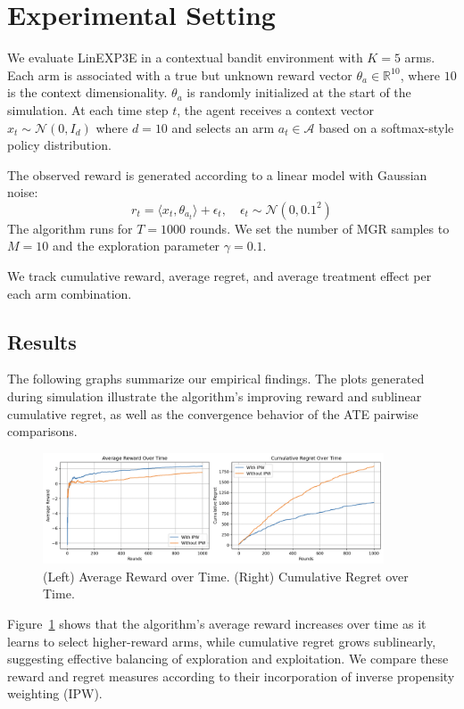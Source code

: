
\section{Experimental Setting}\label{sec:experiments}

We evaluate LinEXP3E in a contextual bandit environment with $K = 5$ arms. Each arm is associated with a true but unknown reward vector $\theta_a \in \mathbb{R}^{10}$, where $10$ is the context dimensionality. $\theta_a$ is randomly initialized at the start of the simulation. At each time step $t$, the agent receives a context vector $x_t \sim \mathcal{N}(0, I_{d})$ where $d=10$ and selects an arm $a_t \in \mathcal{A}$ based on a softmax-style policy distribution.

The observed reward is generated according to a linear model with Gaussian noise:
\[
r_t = \langle x_t, \theta_{a_t} \rangle + \epsilon_t, \quad \epsilon_t \sim \mathcal{N}(0, 0.1^2)
\]
The algorithm runs for $T = 1000$ rounds. We set the number of MGR samples to $M = 10$ and the exploration parameter $\gamma = 0.1$.

We track cumulative reward, average regret, and average treatment effect per each arm combination. 

\subsection{Results}\label{subsec:results}

The following graphs summarize our empirical findings. The plots generated during simulation illustrate the algorithm's improving reward and sublinear cumulative regret, as well as the convergence behavior of the ATE pairwise comparisons.

\begin{figure}[H]
\centering
\includegraphics[width=0.9\textwidth]{performance_comparing_ate.png}
\caption{(Left) Average Reward over Time. (Right) Cumulative Regret over Time.}
\label{fig:reward_regret}
\end{figure}

Figure~\ref{fig:reward_regret} shows that the algorithm’s average reward increases over time as it learns to select higher-reward arms, while cumulative regret grows sublinearly, suggesting effective balancing of exploration and exploitation. We compare these reward and regret measures according to their incorporation of inverse propensity weighting (IPW).

